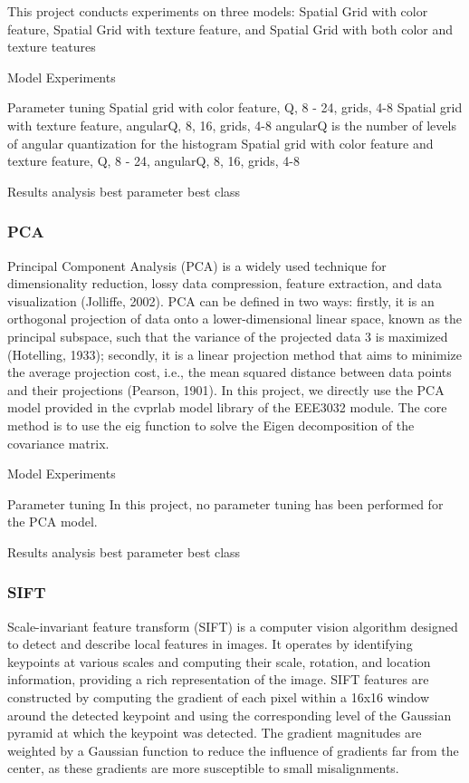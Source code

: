 \documentclass{article}
\begin{document}
This project conducts experiments on three models: Spatial Grid with color feature, Spatial Grid with texture feature, and Spatial Grid with both color and texture teatures



Model Experiments

Parameter tuning
Spatial grid with color feature,  Q, 8 - 24,  grids, 4-8
Spatial grid with texture feature, angularQ, 8, 16, grids, 4-8     angularQ is  the number of levels of angular quantization for the histogram
Spatial grid with color feature and texture feature,  Q, 8 - 24,  angularQ, 8, 16, grids, 4-8

Results analysis
best parameter
best class

\subsubsection{PCA}

Principal Component Analysis (PCA) is a widely used technique for dimensionality reduction, lossy data compression, feature extraction, and data visualization (Jolliffe, 2002).  PCA can be defined in two ways: firstly, it is an orthogonal projection of data onto a lower-dimensional linear space, known as the principal subspace, such that the variance of the projected data 3  is maximized (Hotelling, 1933); secondly, it is a linear projection method that aims to minimize the average projection cost, i.e., the mean squared distance between data points and their projections (Pearson, 1901). In this project, we directly use the PCA model provided in the cvprlab model library of the EEE3032 module. The core method is to use the eig function to solve the Eigen decomposition of the covariance matrix.


Model Experiments

Parameter tuning
In this project, no parameter tuning has been performed for the PCA model.

Results analysis
best parameter
best class



\subsubsection{SIFT}

Scale-invariant feature transform (SIFT) is a computer vision algorithm designed to detect and describe local features in images. It operates by identifying keypoints at various scales and computing their scale, rotation, and location information, providing a rich representation of the image. SIFT features are constructed by computing the gradient of each pixel within a 16x16 window around the detected keypoint and using the corresponding level of the Gaussian pyramid at which the keypoint was detected. The gradient magnitudes are weighted by a Gaussian function to reduce the influence of gradients far from the center, as these gradients are more susceptible to small misalignments.
\end{document}
